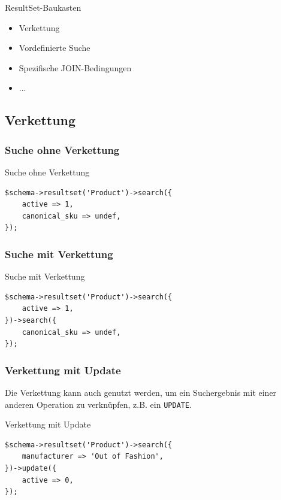 \begin{frame}{ResultSet-Baukasten}
\begin{itemize}
\item Verkettung
\item Vordefinierte Suche
\item Spezifische JOIN-Bedingungen
\item ...
\end{itemize}
\end{frame}

\subsection{Verkettung}

\subsubsection{Suche ohne Verkettung}

\begin{frame}[fragile]{Suche ohne Verkettung}
\begin{lstlisting}
$schema->resultset('Product')->search({
    active => 1,
    canonical_sku => undef,
});
\end{lstlisting}
\end{frame}

\subsubsection{Suche mit Verkettung}

\begin{frame}[fragile]{Suche mit Verkettung}
\begin{lstlisting}
$schema->resultset('Product')->search({
    active => 1,
})->search({
    canonical_sku => undef,
});
\end{lstlisting}
\end{frame}

\subsubsection{Verkettung mit Update}

Die Verkettung kann auch genutzt werden, um
ein Suchergebnis mit einer anderen Operation zu
verknüpfen, z.B. ein \verb|UPDATE|.

\begin{frame}[fragile]{Verkettung mit Update}
\begin{lstlisting}
$schema->resultset('Product')->search({
    manufacturer => 'Out of Fashion',
})->update({
    active => 0,
});
\end{lstlisting}
\end{frame}

